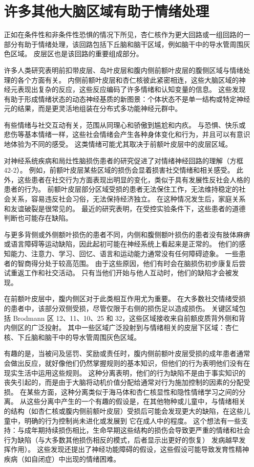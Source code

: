 \section{许多其他大脑区域有助于情绪处理}

正如在条件性和非条件性恐惧的情况下所见，杏仁核作为更大回路或一组回路的一部分有助于情绪处理，该回路包括下丘脑和脑干区域，例如脑干中的导水管周围灰色区域。
皮层区也是该回路的重要组成部分。


许多人类研究表明前扣带皮层、岛叶皮层和腹内侧前额叶皮层的腹侧区域与情绪处理的各个方面有关。
内侧前额叶皮层和杏仁核彼此紧密相连，这些大脑区域的神经元表现出复杂的反应，这些反应编码了许多情绪和认知变量的信息。
这些发现有助于形成情绪状态的动态神经基质的新图景：个体状态不是单一结构或特定神经元的结果，而是更灵活地组装在分布式多功能神经元群中。


有些情绪与社交互动有关，范围从同理心和骄傲到尴尬和内疚。
与恐惧、快乐或悲伤等基本情绪一样，这些社会情绪会产生各种身体变化和行为，并且可以有意识地体验为不同的感受。
这类情绪可能尤其取决于前额叶皮层中的皮层区域。


对神经系统疾病和局灶性脑损伤患者的研究促进了对情绪神经回路的理解（方框 42-2）。
例如，前额叶皮层某些区域的损伤会显着损害社交情绪和相关感受。
此外，这些患者在社交行为方面表现出明显的变化，类似于具有发展性反社会人格的患者的行为。
前额叶皮层部分区域受损的患者无法保住工作，无法维持稳定的社会关系，容易违反社会习俗，无法保持经济独立。
在这种情况发生后，家庭关系和友谊破裂是很常见的。
最近的研究表明，在受控实验条件下，这些患者的道德判断也可能存在缺陷。


与更多背侧或外侧额叶损伤的患者不同，内侧和腹侧额叶损伤的患者没有肢体麻痹或语言障碍等运动缺陷，因此起初可能在神经系统上看起来是正常的。
他们的感知能力、注意力、学习、回忆、语言和运动能力通常没有任何障碍迹象。
一些患者的智商得分处于较高范围。
由于这些原因，他们有时会在脑损伤初步康复后尝试重返工作和社交活动。
只有当他们开始与他人互动时，他们的缺陷才会被发现。


在前额叶皮层中，腹内侧区对于此类相互作用尤为重要。 在大多数社交情绪受损的患者中，该部分双侧受损，尽管仅限于右侧的损伤足以造成损伤。
关键区域包括 Brodmann 区 12、11、10、25 和 32，这些区域接收来自前额皮质背外侧和背内侧区的广泛投射。
其中一些区域广泛投射到与情绪相关的皮层下区域：杏仁核、下丘脑和脑干中的导水管周围灰色区域。


有趣的是，当被问及惩罚、奖励或责任时，腹内侧前额叶皮层受损的成年患者通常会做出反应，就好像他们仍然掌握规则的基本知识，但他们的行为表明他们没有在现实生活中运用这些规则。
这种分离表明，他们的行为缺陷不是由于事实知识的丧失引起的，而是由于大脑将动机价值分配给通常对行为施加控制的因素的分配受损。
在某些方面，这种分离类似于海马体和杏仁核显性和隐性情绪学习之间的分离。
从这些分离中产生的一个有趣的假设是，在其他物种或儿童中，与情绪相关的结构（如杏仁核或腹内侧前额叶皮层）受损后可能会发现更大的缺陷，在这些儿童中，明确的行为控制尚未进化或发展到 它在成人中的程度。
这个想法有一些支持：与成年期持续损伤相比，生命早期这些结构的损伤会导致更严重的情绪和社会行为缺陷（与大多数其他损伤相反的模式，后者显示出更好的恢复） 发病越早发挥作用）。
这些发现还提出了神经功能障碍的假设，这些假设可能导致发育性精神疾病（如自闭症）中出现的情绪困难。


